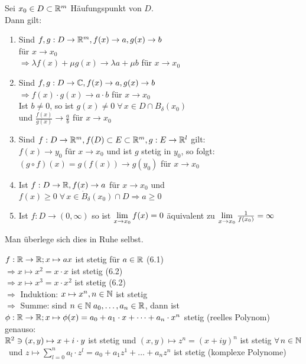 \documentclass[../ana1u.tex]{subfiles}
\begin{document}
\begin{satz}
	Sei \(x_0 \in D \subset \mathbb{R}^m \) Häufungspunkt von \(D\).\\
	Dann gilt:\\
	\begin{enumerate}
		\item 
			Sind \(f, g: D \rightarrow \mathbb{R}^m, f(x) \rightarrow a, g(x) \rightarrow b\)\\
			für \(x \rightarrow x_0\)\\
			\(\Rightarrow \lambda f(x) + \mu g(x) \rightarrow \lambda a + \mu b \) für \(x \rightarrow x_0\)\\
		\item 
			Sind \(f,g: D \rightarrow \mathbb{C}, f(x) \rightarrow a, g(x) \rightarrow b \)\\
			\(\Rightarrow f(x) \cdot g(x) \rightarrow a \cdot b\) für \(x \rightarrow x_0\)\\
			Ist \(b \neq 0\), so ist \(g(x) \neq 0 \; \forall \, x \in D \cap B_\delta(x_0) \)\\
			und \(\frac{f(x)}{g(x)} \rightarrow \frac{a}{b} \) für \(x \rightarrow x_0\)
		\item 
			Sind \(f: D \rightarrow \mathbb{R}^m, f(D) \subset E \subset \mathbb{R}^m, g: E \rightarrow \mathbb{R}^l\) gilt:\\
			\(f(x) \rightarrow y_0\) für \(x \rightarrow x_0\) und ist \(g\) stetig in \(y_0\), so folgt:\\
			\((g \circ f)(x) = g(f(x)) \rightarrow g(y_0) \) für \(x \rightarrow x_0\)
		\item 
			Ist \(f: D \rightarrow \mathbb{R}, f(x) \rightarrow a\) für \(x \rightarrow x_0\) und \(f(x) \geq 0 \; \forall \, x \in \dot{B}_\delta(x_0) \cap D \Rightarrow a \geq 0 \)
		\item 
			Ist \(f: D \rightarrow (0, \infty)\) so ist \(\lim\limits_{x\rightarrow x_0} f(x) = 0\) äquivalent zu \(\lim\limits_{x\rightarrow x_0} \frac{1}{f(x_0)} = \infty\)
	\end{enumerate}	
\end{satz}
\begin{bew}
	Man überlege sich dies in Ruhe selbst.
\end{bew}
\begin{bsp}
	\(f: \mathbb{R} \rightarrow \mathbb{R}; x \mapsto ax \) ist stetig für \(a \in \mathbb{R}\) (6.1)\\
	\(\Rightarrow x \mapsto x^2 = x \cdot x\) ist stetig (6.2)\\
	\(\Rightarrow x \mapsto x^3 = x \cdot x^2 \) ist stetig (6.2)\\
	\(\Rightarrow \) Induktion: \(x \mapsto x^n, n \in \mathbb{N} \) ist stetig\\
	\(\Rightarrow  \) Summe: sind \(n \in \mathbb{N} \; a_0, \dots, a_n \in \mathbb{R}\), dann ist\\
	\(\phi: \mathbb{R} \rightarrow \mathbb{R}; x \mapsto \phi(x) = a_0 + a_1 \cdot x + \dots + a_n \cdot x^n \) stetig (reelles Polynom)\\
	genauso:\\
	\(\mathbb{R}^2 \ni (x, y) \mapsto x + i \cdot y \) ist stetig und \((x, y) \mapsto z^n = (x + iy)^n \) ist stetig \(\forall \, n \in \mathbb{N}\)\
	und \(z \mapsto \sum_{l=0}^{n} a_l \cdot z^l = a_0 + a_1 z^1 + \dots + a_n z^n \) ist stetig (komplexe Polynome)
\end{bsp}
\end{document}
